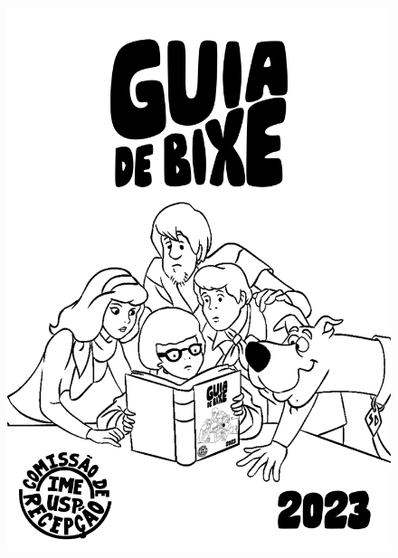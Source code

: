 \documentclass[12pt]{report}
\begin{document}
\begin{figure}[p]
    \includegraphics[height=1\textheight]{img/capa_2023.png} %
\end{figure}
\thispagestyle{empty} %
\clearpage
\newpage





\end{document}
